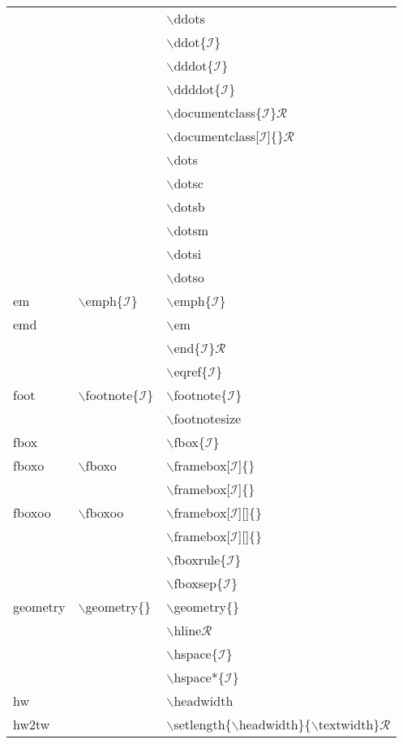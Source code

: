 \begin{longtable}{p{20mm}p{20mm}p{65mm}}
 &  & $\backslash$ddots\\
 &  & $\backslash$ddot\{$\mathcal{I}$\}\\
 &  & $\backslash$dddot\{$\mathcal{I}$\}\\
 &  & $\backslash$ddddot\{$\mathcal{I}$\}\\
 &  & $\backslash$documentclass\{$\mathcal{I}$\}$\mathcal{R}$\\
 &  & $\backslash$documentclass[$\mathcal{I}$]\{\}$\mathcal{R}$\\
 &  & $\backslash$dots\\
 &  & $\backslash$dotsc\\
 &  & $\backslash$dotsb\\
 &  & $\backslash$dotsm\\
 &  & $\backslash$dotsi\\
 &  & $\backslash$dotso\\
em & $\backslash$emph\{$\mathcal{I}$\} & $\backslash$emph\{$\mathcal{I}$\}\\
emd &  & $\backslash$em\\
 &  & $\backslash$end\{$\mathcal{I}$\}$\mathcal{R}$\\
 &  & $\backslash$eqref\{$\mathcal{I}$\}\\
foot & $\backslash$footnote\{$\mathcal{I}$\} & $\backslash$footnote\{$\mathcal{I}$\}\\
 &  & $\backslash$footnotesize\\
fbox &  & $\backslash$fbox\{$\mathcal{I}$\}\\
fboxo & $\backslash$fboxo & $\backslash$framebox[$\mathcal{I}$]\{\}\\
 &  & $\backslash$framebox[$\mathcal{I}$]\{\}\\
fboxoo & $\backslash$fboxoo & $\backslash$framebox[$\mathcal{I}$][]\{\}\\
 &  & $\backslash$framebox[$\mathcal{I}$][]\{\}\\
 &  & $\backslash$fboxrule\{$\mathcal{I}$\}\\
 &  & $\backslash$fboxsep\{$\mathcal{I}$\}\\
geometry & $\backslash$geometry\{\} & $\backslash$geometry\{\}\\
 &  & $\backslash$hline$\mathcal{R}$\\
 &  & $\backslash$hspace\{$\mathcal{I}$\}\\
 &  & $\backslash$hspace*\{$\mathcal{I}$\}\\
hw &  & $\backslash$headwidth\\
hw2tw &  & $\backslash$setlength\{$\backslash$headwidth\}\{$\backslash$textwidth\}$\mathcal{R}$\\

\end{longtable}
